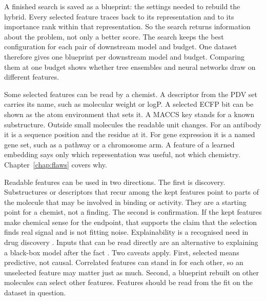 
A finished search is saved as a blueprint: the settings needed to rebuild the hybrid. Every selected feature traces back to its representation and to its importance rank within that representation. So the search returns information about the problem, not only a better score. The search keeps the best configuration for each pair of downstream model and budget. One dataset therefore gives one blueprint per downstream model and budget. Comparing them at one budget shows whether tree ensembles and neural networks draw on different features.

Some selected features can be read by a chemist. A descriptor from the PDV set carries its name, such as molecular weight or logP. A selected ECFP bit can be shown as the atom environment that sets it. A MACCS key stands for a known substructure. Outside small molecules the readable unit changes. For an antibody it is a sequence position and the residue at it. For gene expression it is a named gene set, such as a pathway or a chromosome arm. A feature of a learned embedding says only which representation was useful, not which chemistry. Chapter~\ref{chap:flaws} covers why.

Readable features can be used in two directions. The first is discovery. Substructures or descriptors that recur among the kept features point to parts of the molecule that may be involved in binding or activity. They are a starting point for a chemist, not a finding. The second is confirmation. If the kept features make chemical sense for the endpoint, that supports the claim that the selection finds real signal and is not fitting noise. Explainability is a recognised need in drug discovery \citep{JimenezLuna2020}. Inputs that can be read directly are an alternative to explaining a black-box model after the fact \citep{Rudin2019}. Two caveats apply. First, selected means predictive, not causal. Correlated features can stand in for each other, so an unselected feature may matter just as much. Second, a blueprint rebuilt on other molecules can select other features. Features should be read from the fit on the dataset in question.

